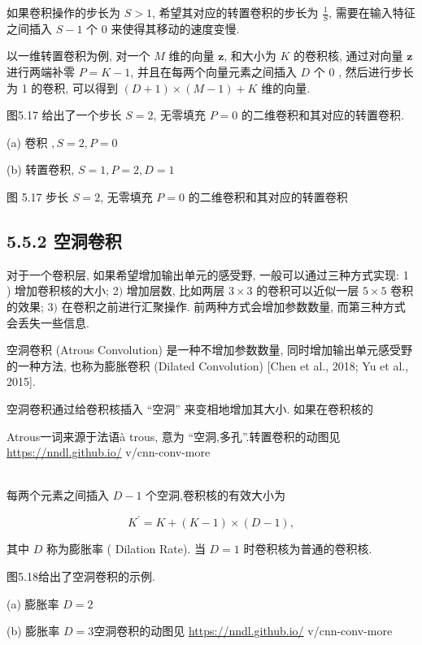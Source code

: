 \documentclass[10pt]{article}
\begin{document}
如果卷积操作的步长为 $S>1$, 希望其对应的转置卷积的步长为 $\frac{1}{S}$, 需要在输入特征之间插入 $S-1$ 个 0 来使得其移动的速度变慢.

以一维转置卷积为例, 对一个 $M$ 维的向量 $\boldsymbol{z}$, 和大小为 $K$ 的卷积核, 通过对向量 $\boldsymbol{z}$ 进行两端补零 $P=K-1$, 并且在每两个向量元素之间插入 $D$ 个 0 , 然后进行步长为 1 的卷积, 可以得到 $(D+1) \times(M-1)+K$ 维的向量.

图5.17 给出了一个步长 $S=2$, 无零填充 $P=0$ 的二维卷积和其对应的转置卷积.



(a) 卷积 $, S=2, P=0$



(b) 转置卷积, $S=1, P=2, D=1$

图 5.17 步长 $S=2$, 无零填充 $P=0$ 的二维卷积和其对应的转置卷积

\subsection*{5.5.2 空洞卷积}
对于一个卷积层, 如果希望增加输出单元的感受野, 一般可以通过三种方式实现: 1 ) 增加卷积核的大小; 2$)$ 增加层数, 比如两层 $3 \times 3$ 的卷积可以近似一层 $5 \times 5$ 卷积的效果; 3$)$ 在卷积之前进行汇聚操作. 前两种方式会增加参数数量, 而第三种方式会丢失一些信息.

空洞卷积 (Atrous Convolution) 是一种不增加参数数量, 同时增加输出单元感受野的一种方法, 也称为膨胀卷积 (Dilated Convolution) [Chen et al., 2018; Yu et al., 2015].

空洞卷积通过给卷积核插入 “空洞” 来变相地增加其大小. 如果在卷积核的

Atrous一词来源于法语à trous, 意为 “空洞,多孔”.转置卷积的动图见 \href{https://nndl.github.io/}{https://nndl.github.io/} v/cnn-conv-more

\\
每两个元素之间插入 $D-1$ 个空洞,卷积核的有效大小为


\begin{equation*}
K^{\prime}=K+(K-1) \times(D-1), \tag{5.50}
\end{equation*}


其中 $D$ 称为膨胀率 ( Dilation Rate). 当 $D=1$ 时卷积核为普通的卷积核.

图5.18给出了空洞卷积的示例.



(a) 膨胀率 $D=2$



(b) 膨胀率 $D=3$空洞卷积的动图见 \href{https://nndl.github.io/}{https://nndl.github.io/} v/cnn-conv-more
\end{document}
